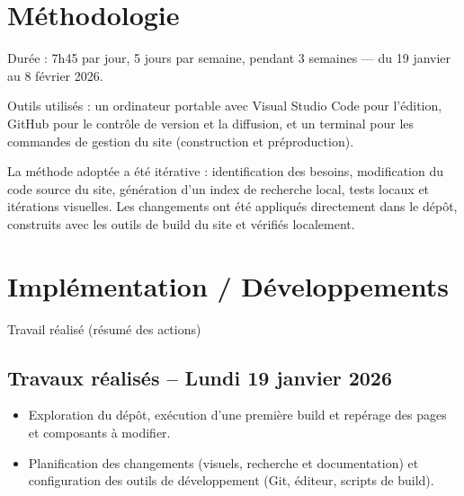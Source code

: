 \documentclass[12pt,a4paper]{report}
\begin{document}
\section{Méthodologie}
Durée : 7h45 par jour, 5 jours par semaine, pendant 3 semaines — du 19 janvier au 8 février 2026.

Outils utilisés : un ordinateur portable avec Visual Studio Code pour l'édition, GitHub pour le contrôle de version et la diffusion, et un terminal pour les commandes de gestion du site (construction et préproduction).

La méthode adoptée a été itérative : identification des besoins, modification du code source du site, génération d'un index de recherche local, tests locaux et itérations visuelles. Les changements ont été appliqués directement dans le dépôt, construits avec les outils de build du site et vérifiés localement.

\section{Implémentation / Développements}
Travail réalisé (résumé des actions)
\subsection*{Travaux réalisés -- Lundi 19 janvier 2026}
\begin{itemize}
  \item Exploration du dépôt, exécution d'une première build et repérage des pages et composants à modifier.
  \item Planification des changements (visuels, recherche et documentation) et configuration des outils de développement (Git, éditeur, scripts de build).
\end{itemize}
\end{document}
